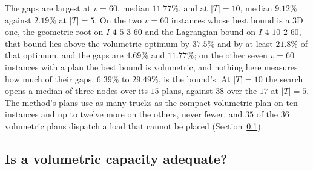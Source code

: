 The gaps are largest at $v=60$, median $11.77\%$, and at $|T|=10$,
median $9.12\%$ against $2.19\%$ at $|T|=5$. On the two $v=60$
instances whose best bound is a 3D one, the geometric root on
$I\_4\_5\_3\_60$ and the Lagrangian bound on $I\_4\_10\_2\_60$, that
bound lies above the volumetric optimum by $37.5\%$ and by at least
$21.8\%$ of that optimum, and the gaps are $4.69\%$ and $11.77\%$; on
the other seven $v=60$ instances with a plan the best bound is
volumetric, and nothing here measures how much of their gaps, $6.39\%$
to $29.49\%$, is the bound's. At $|T|=10$ the search opens a median of
three nodes over its $15$ plans, against $38$ over the $17$ at
$|T|=5$. The method's
plans use as many trucks as the compact volumetric plan on ten
instances and up to twelve more on the others, never fewer, and $35$
of the $36$ volumetric plans dispatch a load that cannot be placed
(Section~\ref{sec:res-abstraction}).

\subsection{Is a volumetric capacity adequate?}
\label{sec:res-abstraction}



